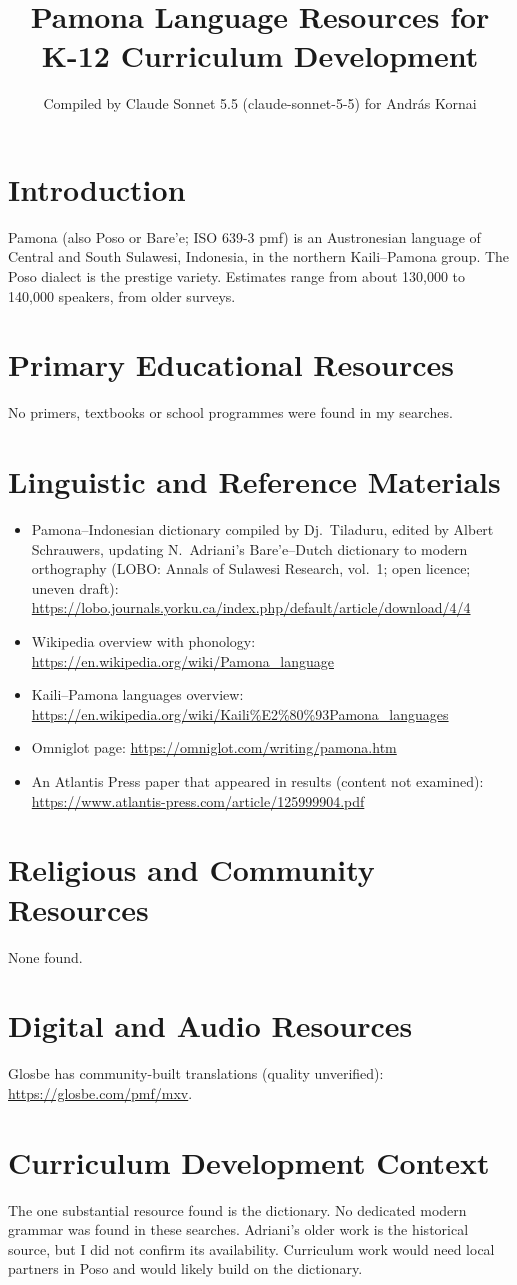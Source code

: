 \documentclass[12pt]{article}
\title{Pamona Language Resources for K-12 Curriculum Development}
\author{Compiled by Claude Sonnet 5.5 (claude-sonnet-5-5) for Andr\'as Kornai}
\date{}
\begin{document}
\maketitle

\section{Introduction}
Pamona (also Poso or Bare'e; ISO 639-3 pmf) is an Austronesian language of Central and South Sulawesi, Indonesia, in the northern Kaili--Pamona group. The Poso dialect is the prestige variety. Estimates range from about 130,000 to 140,000 speakers, from older surveys.

\section{Primary Educational Resources}
No primers, textbooks or school programmes were found in my searches.

\section{Linguistic and Reference Materials}
\begin{itemize}
\item Pamona--Indonesian dictionary compiled by Dj.\ Tiladuru, edited by Albert Schrauwers, updating N.\ Adriani's Bare'e--Dutch dictionary to modern orthography (LOBO: Annals of Sulawesi Research, vol.\ 1; open licence; uneven draft): \url{https://lobo.journals.yorku.ca/index.php/default/article/download/4/4}
\item Wikipedia overview with phonology: \url{https://en.wikipedia.org/wiki/Pamona_language}
\item Kaili--Pamona languages overview: \url{https://en.wikipedia.org/wiki/Kaili%E2%80%93Pamona_languages}
\item Omniglot page: \url{https://omniglot.com/writing/pamona.htm}
\item An Atlantis Press paper that appeared in results (content not examined): \url{https://www.atlantis-press.com/article/125999904.pdf}
\end{itemize}

\section{Religious and Community Resources}
None found.

\section{Digital and Audio Resources}
Glosbe has community-built translations (quality unverified): \url{https://glosbe.com/pmf/mxv}.

\section{Curriculum Development Context}
The one substantial resource found is the dictionary. No dedicated modern grammar was found in these searches. Adriani's older work is the historical source, but I did not confirm its availability. Curriculum work would need local partners in Poso and would likely build on the dictionary.
\end{document}
